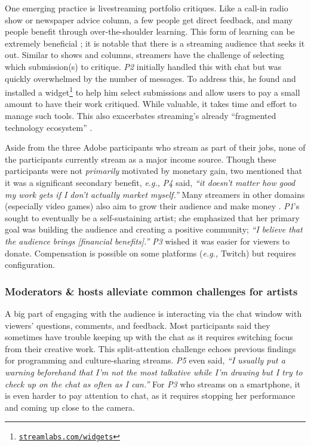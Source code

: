 One emerging practice is livestreaming portfolio critiques. Like a call-in radio show or newspaper advice column, a few people get direct feedback, and many people benefit through over-the-shoulder learning. This form of learning can be extremely beneficial \cite{Lopez2010}; it is notable that there is a streaming audience that seeks it out. Similar to shows and columns, streamers have the challenge of selecting which submission(s) to critique. \textit{P2} initially handled this with chat but was quickly overwhelmed by the number of messages. To address this, he found and installed a widget\footnote{\href{https://streamlabs.com/widgets}{\nolinkurl{streamlabs.com/widgets}}} to help him select submissions and allow users to pay a small amount to have their work critiqued. While valuable, it takes time and effort to manage such tools. This also exacerbates streaming's already ``fragmented technology ecosystem'' \cite{Lu2019}.

Aside from the three Adobe participants who stream as part of their jobs, none of the participants currently stream as a major income source. Though these participants were not \textit{primarily} motivated by monetary gain, two mentioned that it was a significant secondary benefit, \textit{e.g., } \textit{P4} said, \textit{``it doesn't matter how good my work gets if I don't actually market myself.''} Many streamers in other domains (especially video games) also aim to grow their audience and make money \cite{Pellicone2017}. \textit{P1}'s sought to eventually be a self-sustaining artist; she emphasized that her primary goal was building the audience and creating a positive community; \textit{``I believe that the audience brings [financial benefits].''} \textit{P3} wished it was easier for viewers to donate. Compensation is possible on some platforms (\textit{e.g.,} Twitch) but requires configuration.

\subsubsection{Moderators \& hosts alleviate common challenges for artists}
A big part of engaging with the audience is interacting via the chat window with viewers' questions, comments, and feedback. 
Most participants said they sometimes have trouble keeping up with the chat as it requires switching focus from their creative work. This split-attention challenge echoes previous findings for programming \cite{Faas2018} and culture-sharing \cite{Lu2019} streams.
\textit{P5} even said, \textit{``I usually put a warning beforehand that I'm not the most talkative while I'm drawing but I try to check up on the chat as often as I can.''} For \textit{P3} who streams on  a smartphone, it is even harder to pay attention to chat, as it requires stopping her performance and coming up close to the camera.

